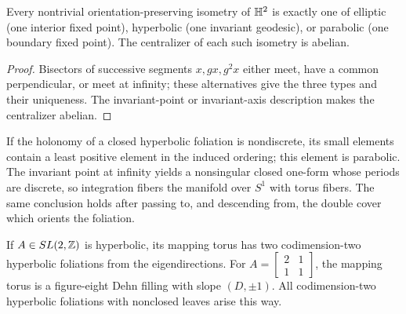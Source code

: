 \begin{proposition}
\label{thurston-ch04-hyperbolic-plane-isometries}
Every nontrivial orientation-preserving isometry of \(\mathbb{H}^2\) is exactly one of elliptic (one interior fixed point), hyperbolic (one invariant geodesic), or parabolic (one boundary fixed point). The centralizer of each such isometry is abelian.

\end{proposition}

\begin{proof}
\sketch Bisectors of successive segments \(x,gx,g^2x\) either meet, have a common perpendicular, or meet at infinity; these alternatives give the three types and their uniqueness. The invariant-point or invariant-axis description makes the centralizer abelian.
\end{proof}

\begin{proposition}
\label{thurston-ch04-nondiscrete-foliation-torus-bundle}
If the holonomy of a closed hyperbolic foliation is nondiscrete, its small elements contain a least positive element in the induced ordering; this element is parabolic. The invariant point at infinity yields a nonsingular closed one-form whose periods are discrete, so integration fibers the manifold over \(S^1\) with torus fibers. The same conclusion holds after passing to, and descending from, the double cover which orients the foliation.

\end{proposition}

\begin{example}
\label{thurston-ch04-hyperbolic-torus-bundles}
If \(A\in SL(2,\mathbb{Z})\) is hyperbolic, its mapping torus has two codimension-two hyperbolic foliations from the eigendirections. For \(A=\begin{bmatrix}2&1\\1&1\end{bmatrix}\), the mapping torus is a figure-eight Dehn filling with slope \((D,\pm1)\). All codimension-two hyperbolic foliations with nonclosed leaves arise this way.

\end{example}

